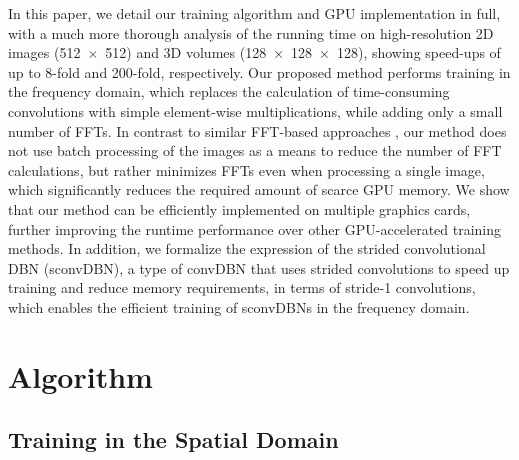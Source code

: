 In this paper, we detail our training algorithm and GPU implementation in full,
with a much more thorough analysis of the running time on high-resolution 2D
images (\num{512x512}) and 3D volumes (\num{128x128x128}), showing speed-ups of
up to 8-fold and 200-fold, respectively. Our proposed method performs training
in the frequency domain, which replaces the calculation of time-consuming
convolutions with simple element-wise multiplications, while adding only a small
number of FFTs. In contrast to similar FFT-based approaches
\citep[e.g.,][]{Mathieu2013}, our method does not use batch processing of the
images as a means to reduce the number of FFT calculations, but rather minimizes
FFTs even when processing a single image, which significantly reduces the
required amount of scarce GPU memory. We show that our method can be efficiently
implemented on multiple graphics cards, further improving the runtime
performance over other GPU-accelerated training methods. In addition, we
formalize the expression of the strided convolutional DBN (sconvDBN), a type of
convDBN that uses strided convolutions to speed up training and reduce memory
requirements, in terms of stride-1 convolutions, which enables the efficient
training of sconvDBNs in the frequency domain.


\section{Algorithm}


\subsection{Training in the Spatial Domain}


